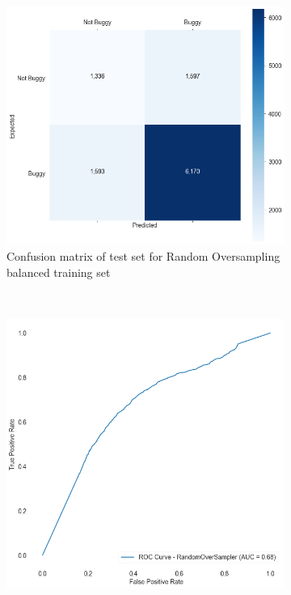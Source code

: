 \begin{figure}[H]
	\begin{subfigure}{\textwidth}
		\centering
		\includegraphics[scale=0.3]{./src/methodBug/methodbug_rover_cm.png}
		\caption{Confusion matrix of test set for Random Oversampling balanced training set}\label{}
	\end{subfigure}\\
	\begin{subfigure}{.5\textwidth}
		\centering
		\includegraphics[scale=0.3]{./src/methodBug/methodbug_rover_roc.png}

\end{subfigure}
\end{figure}
